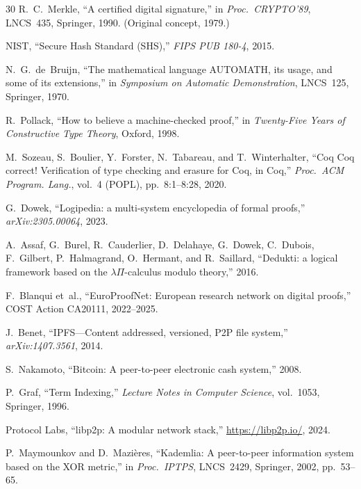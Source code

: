 \documentclass[11pt]{article}
\theoremstyle{definition}
\theoremstyle{plain}
\theoremstyle{remark}
\begin{document}
\begin{thebibliography}{30}
R.~C.~Merkle,
``A certified digital signature,''
in \emph{Proc.\ CRYPTO'89}, LNCS~435, Springer, 1990.
(Original concept, 1979.)

NIST,
``Secure Hash Standard (SHS),''
\emph{FIPS PUB 180-4}, 2015.

N.~G.~de~Bruijn,
``The mathematical language AUTOMATH, its usage, and some of its extensions,''
in \emph{Symposium on Automatic Demonstration}, LNCS~125, Springer, 1970.

R.~Pollack,
``How to believe a machine-checked proof,''
in \emph{Twenty-Five Years of Constructive Type Theory}, Oxford, 1998.

M.~Sozeau, S.~Boulier, Y.~Forster, N.~Tabareau, and T.~Winterhalter,
``Coq Coq correct! Verification of type checking and erasure for Coq, in Coq,''
\emph{Proc.\ ACM Program. Lang.}, vol.~4 (POPL), pp.~8:1--8:28, 2020.

G.~Dowek,
``Logipedia: a multi-system encyclopedia of formal proofs,''
\emph{arXiv:2305.00064}, 2023.

A.~Assaf, G.~Burel, R.~Cauderlier, D.~Delahaye, G.~Dowek, C.~Dubois, F.~Gilbert, P.~Halmagrand,
O.~Hermant, and R.~Saillard,
``Dedukti: a logical framework based on the $\lambda\Pi$-calculus modulo theory,''
2016.

F.~Blanqui et~al.,
``EuroProofNet: European research network on digital proofs,''
COST Action CA20111, 2022--2025.

J.~Benet,
``IPFS---Content addressed, versioned, P2P file system,''
\emph{arXiv:1407.3561}, 2014.

S.~Nakamoto,
``Bitcoin: A peer-to-peer electronic cash system,''
2008.

P.~Graf,
``Term Indexing,''
\emph{Lecture Notes in Computer Science}, vol.~1053, Springer, 1996.

Protocol Labs,
``libp2p: A modular network stack,''
\url{https://libp2p.io/}, 2024.

P.~Maymounkov and D.~Mazi\`eres,
``Kademlia: A peer-to-peer information system based on the XOR metric,''
in \emph{Proc.\ IPTPS}, LNCS~2429, Springer, 2002, pp.~53--65.

\end{thebibliography}
\end{document}
